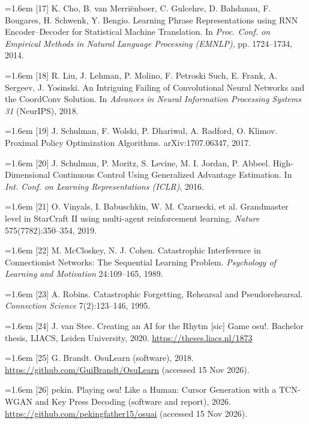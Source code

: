 \documentclass[10pt,a4paper]{article}
\begin{document}
{\hangindent=1.6em [17] K. Cho, B. van Merriënboer, C. Gulcehre, D. Bahdanau, F. Bougares, H. Schwenk, Y. Bengio. Learning Phrase Representations using RNN Encoder–Decoder for Statistical Machine Translation. In \textit{Proc. Conf. on Empirical Methods in Natural Language Processing (EMNLP)}, pp. 1724–1734, 2014.\par}

{\hangindent=1.6em [18] R. Liu, J. Lehman, P. Molino, F. Petroski Such, E. Frank, A. Sergeev, J. Yosinski. An Intriguing Failing of Convolutional Neural Networks and the CoordConv Solution. In \textit{Advances in Neural Information Processing Systems 31} (NeurIPS), 2018.\par}

{\hangindent=1.6em [19] J. Schulman, F. Wolski, P. Dhariwal, A. Radford, O. Klimov. Proximal Policy Optimization Algorithms. arXiv:1707.06347, 2017.\par}

{\hangindent=1.6em [20] J. Schulman, P. Moritz, S. Levine, M. I. Jordan, P. Abbeel. High-Dimensional Continuous Control Using Generalized Advantage Estimation. In \textit{Int. Conf. on Learning Representations (ICLR)}, 2016.\par}

{\hangindent=1.6em [21] O. Vinyals, I. Babuschkin, W. M. Czarnecki, et al. Grandmaster level in StarCraft II using multi-agent reinforcement learning. \textit{Nature} 575(7782):350–354, 2019.\par}

{\hangindent=1.6em [22] M. McCloskey, N. J. Cohen. Catastrophic Interference in Connectionist Networks: The Sequential Learning Problem. \textit{Psychology of Learning and Motivation} 24:109–165, 1989.\par}

{\hangindent=1.6em [23] A. Robins. Catastrophic Forgetting, Rehearsal and Pseudorehearsal. \textit{Connection Science} 7(2):123–146, 1995.\par}

{\hangindent=1.6em [24] J. van Stee. Creating an AI for the Rhytm [sic] Game osu!. Bachelor thesis, LIACS, Leiden University, 2020. \url{https://theses.liacs.nl/1873}\par}

{\hangindent=1.6em [25] G. Brandt. OsuLearn (software), 2018. \url{https://github.com/GuiBrandt/OsuLearn} (accessed 15 Nov 2026).\par}

{\hangindent=1.6em [26] pekin. Playing osu! Like a Human: Cursor Generation with a TCN-WGAN and Key Press Decoding (software and report), 2026. \url{https://github.com/pekingfather15/osuai} (accessed 15 Nov 2026).\par}
\end{document}
